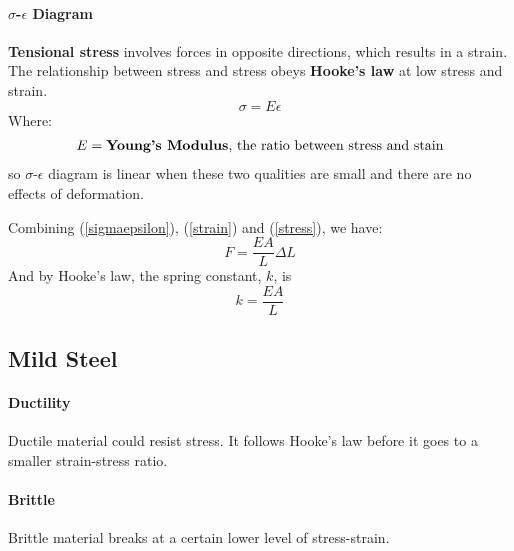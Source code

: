 \paragraph{$\sigma$-$\epsilon$ Diagram} \textbf{Tensional stress} involves forces in opposite directions, which results in a strain. The relationship between stress and stress obeys \textbf{Hooke's law} at low stress and strain.
    \begin{equation}\label{sigmaepsilon}
        \sigma = E\epsilon
    \end{equation}
    Where:
    \begin{equation*}
    \begin{split}
    E = \text{\textbf{Young's Modulus}, the ratio between stress and stain} \\
    \end{split}
    \end{equation*}
so $\sigma$-$\epsilon$ diagram is linear when these two qualities are small and there are no effects of deformation. 
\begin{example}
    Combining (\ref{sigmaepsilon}), (\ref{strain}) and (\ref{stress}), we have:
    \begin{equation}
        F = \frac{EA}{L}\Delta L
    \end{equation}
    And by Hooke's law, the spring constant, $k$, is 
    \begin{equation}
        k = \frac{EA}{L}
    \end{equation}
\end{example}
\subsection{Mild Steel}
\paragraph{Ductility} Ductile material could resist stress. It follows Hooke's law before it goes to a smaller strain-stress ratio. 
\paragraph{Brittle} Brittle material breaks at a certain lower level of stress-strain. 
